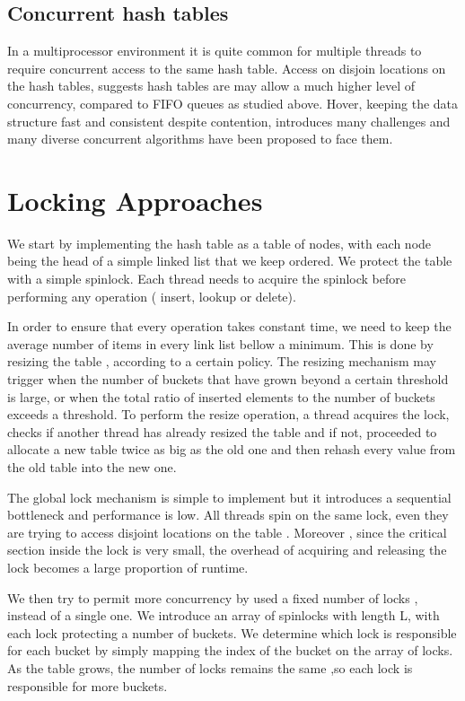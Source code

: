 \subsection{Concurrent hash tables}

In a multiprocessor environment it is quite common for multiple threads to require concurrent access to the same hash table. Access on disjoin locations on the hash tables, suggests hash tables are may allow a much higher level of concurrency, compared to FIFO queues as studied above. Hover, keeping the data structure fast and consistent despite contention, introduces many challenges and many diverse concurrent algorithms have been proposed to face them.
   

\section{ Locking  Approaches}

We start by implementing the hash table as a table of nodes, with each node being the head of a simple linked list that we keep ordered. We protect the table with a simple spinlock. Each thread needs to acquire the spinlock before performing any operation ( insert, lookup or delete). 

In order to ensure that every operation takes constant time, we need to keep the average number of items in every link list bellow a minimum. This is done by resizing the table , according to a certain policy. The resizing mechanism may trigger when the number of buckets that have grown beyond a certain threshold is large, or when the total ratio of inserted elements to the number of buckets exceeds a threshold. To perform the resize operation, a thread acquires the lock, checks if another thread has already resized the table and if not, proceeded to allocate a new table twice as big as the old one and then rehash every value from the old table into the new one.

The global lock mechanism is simple to implement but it introduces a sequential bottleneck and performance is low. All threads spin on the same lock, even they are trying to access disjoint locations on the table . Moreover , since the critical section inside the lock is very small, the overhead of acquiring and releasing the lock becomes a large proportion of runtime.

We then try to permit more concurrency by used a fixed number of locks , instead of a single one. We introduce an array of spinlocks with length L, with each lock protecting a number of buckets. We determine which lock is responsible for each bucket by simply mapping the index of the bucket on the array of locks. As the table grows, the number of locks remains the same ,so each lock is responsible for more buckets.

